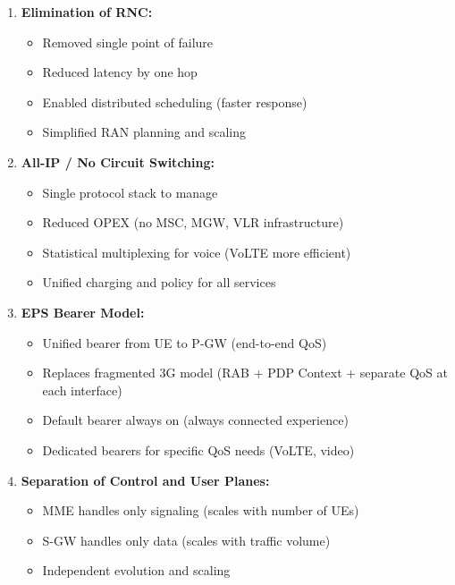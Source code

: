 



\begin{enumerate}
\def\labelenumi{\arabic{enumi}.}
\tightlist
\item
  \textbf{Elimination of RNC:}

  \begin{itemize}
  \tightlist
  \item
    Removed single point of failure
  \item
    Reduced latency by one hop
  \item
    Enabled distributed scheduling (faster response)
  \item
    Simplified RAN planning and scaling
  \end{itemize}
\item
  \textbf{All-IP /\allowbreak{} No Circuit Switching:}

  \begin{itemize}
  \tightlist
  \item
    Single protocol stack to manage
  \item
    Reduced OPEX (no MSC, MGW, VLR infrastructure)
  \item
    Statistical multiplexing for voice (VoLTE more efficient)
  \item
    Unified charging and policy for all services
  \end{itemize}
\item
  \textbf{EPS Bearer Model:}

  \begin{itemize}
  \tightlist
  \item
    Unified bearer from UE to P-GW (end-to-end QoS)
  \item
    Replaces fragmented 3G model (RAB + PDP Context + separate QoS at each interface)
  \item
    Default bearer always on (always connected experience)
  \item
    Dedicated bearers for specific QoS needs (VoLTE, video)
  \end{itemize}
\item
  \textbf{Separation of Control and User Planes:}

  \begin{itemize}
  \tightlist
  \item
    MME handles only signaling (scales with number of UEs)
  \item
    S-GW handles only data (scales with traffic volume)
  \item
    Independent evolution and scaling
  \end{itemize}
\end{enumerate}

